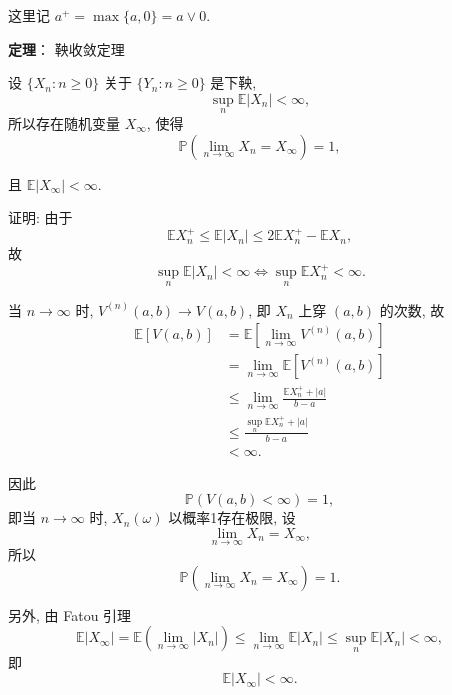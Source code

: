 \documentclass[openany]{ctexbook}
\theoremstyle{kaiti}
\theoremstyle{normal}
\begin{document}
这里记 $a^+=\max\{a,0\}=a\vee0$.

\textbf{定理}： 鞅收敛定理

设 $\{X_n:n\geqslant0\}$ 关于 $\{Y_n:n\geqslant0\}$ 是下鞅, 
\begin{equation}
  \sup_n\mathbb{E}|X_n|<\infty,
\end{equation}
所以存在随机变量 $X_\infty$, 使得
\begin{equation}
  \mathbb{P}\left(\lim_{n\to\infty}X_n=X_\infty\right)=1,
\end{equation}

且 $\mathbb{E}|X_\infty|<\infty$.

证明: 由于
\begin{equation}
  \mathbb{E}X_n^+\leqslant \mathbb{E}|X_n|\leqslant 2\mathbb{E}X_n^+-\mathbb{E}X_n,
\end{equation}
故
\begin{equation}
  \sup_n\mathbb{E}|X_n|<\infty\Leftrightarrow\sup_n\mathbb{E}X_n^+<\infty.
\end{equation}

当 $n\to\infty$ 时, $V^{(n)}(a,b)\to V(a,b)$, 即 $X_n$ 上穿 $(a,b)$ 的次数, 故
\begin{equation}
  \begin{aligned}
    \mathbb{E}[V(a,b)]
    &=\mathbb{E}\left[\lim_{n\to\infty}V^{(n)}(a,b)\right]\\
    &=\lim_{n\to\infty}\mathbb{E}\left[V^{(n)}(a,b)\right]\\
    &\leqslant \lim_{n\to\infty}\frac{\mathbb{E}X_n^++|a|}{b-a}\\
    &\leqslant\frac{\sup_{n}\mathbb{E}X_n^++|a|}{b-a}\\
    &<\infty.
  \end{aligned}
\end{equation}

因此
\begin{equation}
  \mathbb{P}(V(a,b)<\infty)=1,
\end{equation}
即当 $n\to\infty$ 时, $X_n(\omega)$ 以概率1存在极限, 设
\begin{equation}
  \lim_{n\to\infty}X_n=X_\infty,
\end{equation}
所以
\begin{equation}
  \mathbb{P}\left(\lim_{n\to\infty}X_n=X_\infty\right)=1.
\end{equation}

另外, 由 Fatou 引理
\begin{equation}
  \mathbb{E}|X_\infty|=\mathbb{E}\left(\lim_{n\to\infty}|X_n|\right)\leqslant\lim_{n\to\infty}\mathbb{E}|X_n|\leqslant\sup_n\mathbb{E}|X_n|<\infty,
\end{equation}
即
\begin{equation}
  \mathbb{E}|X_\infty|<\infty.
\end{equation}
\end{document}
